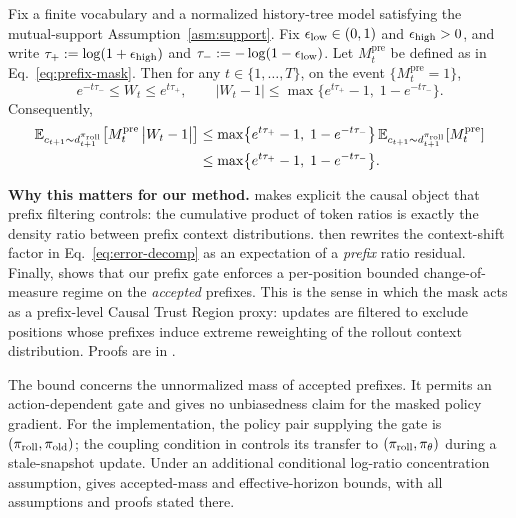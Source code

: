 \begin{theorem}
\label{thm:pre-causal-mechanism}
Fix a finite vocabulary and a normalized history-tree model satisfying the mutual-support
Assumption~\ref{asm:support}. Fix $\epsilon_{\mathrm{low}}\in(0,1)$ and $\epsilon_{\mathrm{high}}>0$, and write
$\tau_+ := \log(1+\epsilon_{\mathrm{high}})$ and $\tau_- := -\log(1-\epsilon_{\mathrm{low}})$. Let
$M_t^{\mathrm{pre}}$ be defined as in Eq.~\eqref{eq:prefix-mask}. Then for any $t\in\{1,\ldots,T\}$, on the event
$\{M_t^{\mathrm{pre}}=1\}$,
\begin{equation*}
    e^{-t\tau_-} \le W_t \le e^{t\tau_+},
    \qquad
    \big|W_t-1\big|
    \le
    \max\!\big\{e^{t\tau_+}-1,\;1-e^{-t\tau_-}\big\}.
\end{equation*}
Consequently,
\begin{align*}
    \mathbb{E}_{c_{t+1}\sim d_{t+1}^{\pi_{\mathrm{roll}}}}\!\left[M_t^{\mathrm{pre}}\,\big|W_t-1\big|\right]
    &\le
    \max\!\big\{e^{t\tau_+}-1,\;1-e^{-t\tau_-}\big\}\,
    \mathbb{E}_{c_{t+1}\sim d_{t+1}^{\pi_{\mathrm{roll}}}}\!\left[M_t^{\mathrm{pre}}\right]
    \\
    &\le
    \max\!\big\{e^{t\tau_+}-1,\;1-e^{-t\tau_-}\big\}.
\end{align*}
\end{theorem}

\noindent\textbf{Why this matters for our method.}
 makes explicit the causal object that prefix filtering controls: the cumulative product of token ratios is
exactly the density ratio between prefix context distributions.  then rewrites the context-shift factor in
Eq.~\eqref{eq:error-decomp} as an expectation of a \emph{prefix} ratio residual. Finally,  shows that our
prefix gate enforces a per-position bounded change-of-measure regime on the \emph{accepted} prefixes. This is the sense in which the mask
acts as a prefix-level Causal Trust Region proxy: updates are filtered to exclude positions whose prefixes induce extreme reweighting of
the rollout context distribution. Proofs are in .

The bound concerns the unnormalized mass of accepted prefixes. It permits
an action-dependent gate and gives no unbiasedness claim for the masked
policy gradient. For the implementation, the policy pair supplying the gate
is $(\pi_{\mathrm{roll}},\pi_{\mathrm{old}})$; the coupling condition in 
controls its transfer to $(\pi_{\mathrm{roll}},\pi_{\theta})$ during a stale-snapshot update.
Under an additional conditional log-ratio concentration assumption,
 gives accepted-mass and effective-horizon
bounds, with all assumptions and proofs stated there.

